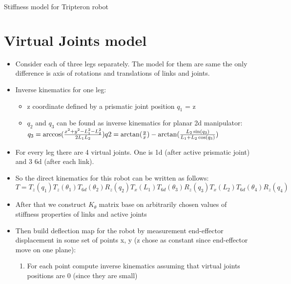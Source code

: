 \documentclass[12pt]{article}
\begin{document}
	\begin{center}
		\LARGE{Stiffness model for Tripteron robot}
	\end{center}
	\section{Virtual Joints model}
	\begin{itemize}
		\item Consider each of three legs separately. The model for them are same the only difference is axis of rotations and translations of links and joints.
		
		\item Inverse kinematics for one leg:
		\begin{itemize}
			\item z coordinate defined by a prismatic joint position $q_1$ = z
			\item $q_2$ and $q_3$ can be found as inverse kinematics for planar 2d manipulator: \\
			\begin{math}
				q_3 = \arccos(\frac{x^2 + y^2 - L_1^2 - L_2^2}{2 L_1 L_2}) \\
				q2 = \arctan(\frac{y}{x}) - \arctan(\frac{L_2 \sin(q_3)}{L_1 + L_2 \cos(q_3)})
			\end{math}
		\end{itemize}
		
		\item For every leg there are 4 virtual joints. One is 1d (after active prismatic joint) and 3 6d (after each link).
		
		\item So the direct kinematics for this robot can be written as follows: \\
		\begin{math}
			T = T_{z}(q_1)T_{z}(\theta _{1})T_{6d}(\theta _{2})R_{z}(q_2)T_{x}(L_1)T_{6d}(\theta _3)R_z(q_3)T_x(L_2)T_{6d}(\theta _4)R_z(q_4)
		\end{math}
		
		\item After that we construct $K_\theta$ matrix base on arbitrarily chosen values of stiffness properties of links and active joints
		
		\item Then build deflection map for the robot by measurement end-effector displacement in some set of points x, y (z chose as constant since end-effector move on one plane):
		\begin{enumerate}
			\item For each point compute inverse kinematics assuming that virtual joints positions are 0 (since they are small)
			

\end{enumerate}
\end{itemize}
\end{document}
